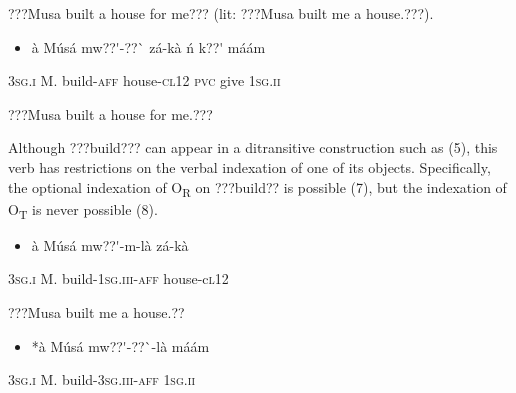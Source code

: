 \documentclass[output=paper]{langsci/langscibook}
\begin{document}
\begin{styleTranslation}
???Musa built a house for me??? (lit: ???Musa built me a house.???). 
\end{styleTranslation}

\begin{itemize}
\item \begin{styleNumberedEX}
\label{bkm:Ref446636188}\`{a}    M\'{u}s\'{a}  mw??\'{ }-??\`{ }    z\'{a}-k\`{a}    \'{n}  k??\'{ }  m\'{a}\'{a}m
\end{styleNumberedEX}\end{itemize}
\begin{styleGloss}
\textsc{3sg.i  }  M.  build-\textsc{aff}  house\textsc{{}-cl12}  \textsc{pvc}  give  \textsc{1sg.ii}
\end{styleGloss}

\begin{styleTranslation}
???Musa built a house for me.???
\end{styleTranslation}

Although ???build??? can appear in a ditransitive construction such as (5), this verb has restrictions on the verbal indexation of one of its objects. Specifically, the optional indexation of O\textsubscript{R} on ???build?? is possible (7), but the indexation of O\textsubscript{T} is never possible (8).

\begin{itemize}
\item \begin{styleNumberedEX}
\label{bkm:Ref446636228}\`{a}    M\'{u}s\'{a}  mw??\'{ }-m-l\`{a}    z\'{a}-k\`{a}
\end{styleNumberedEX}\end{itemize}
\begin{styleGloss}
\textsc{3sg.i  }  M.  build-\textsc{1sg.iii-aff}  house-c\textsc{l12}
\end{styleGloss}

\begin{styleTranslation}
???Musa built me a house.??
\end{styleTranslation}

\begin{itemize}
\item \begin{styleNumberedEX}
\label{bkm:Ref446636239}*\`{a}    M\'{u}s\'{a}  mw??\'{ }-??\`{ }-l\`{a}    m\'{a}\'{a}m
\end{styleNumberedEX}\end{itemize}
\begin{styleGloss}
\textsc{3sg.i  }  M.  build-\textsc{3sg.iii-aff}  \textsc{1sg.ii}
\end{styleGloss}
\end{document}
